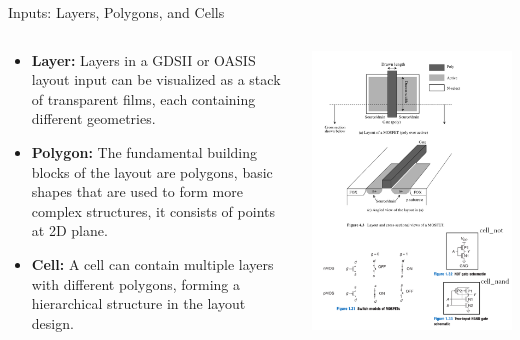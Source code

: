 \documentclass[aspectratio=169]{beamer} %
\begin{document}
\begin{frame}{Inputs: Layers, Polygons, and Cells}
    \begin{columns}[T]
        \begin{column}{.6\textwidth}
        \begin{itemize}
        \item \textbf{Layer:} Layers in a GDSII or OASIS layout input can be visualized as a stack of transparent films, each containing different geometries.
        \item \textbf{Polygon:} The fundamental building blocks of the layout are polygons, basic shapes that are used to form more complex structures, it consists of points at 2D plane.
        \item \textbf{Cell:} A cell can contain multiple layers with different polygons, forming a hierarchical structure in the layout design.
        \end{itemize}
        \end{column}
        \begin{column}{.4\textwidth}
            \includegraphics[width=\textwidth,height=0.8\textheight,keepaspectratio]{cmos_logics.png}
        \end{column}
    \end{columns}
\end{frame}
\end{document}
